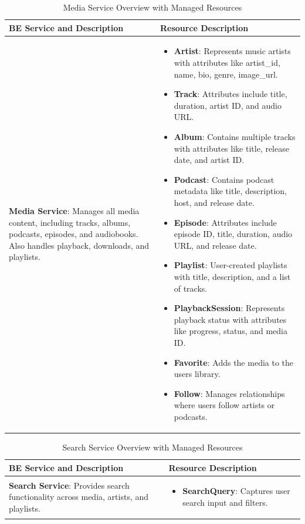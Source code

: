 \documentclass[a4paper,12pt]{article}
\begin{document}
\begin{table}[H]
    \centering
    \renewcommand{\arraystretch}{1.5}
    \begin{tabular}{|>{\centering\arraybackslash}m{4cm}|m{10cm}|}
    \hline
    \textbf{BE Service and Description} & \textbf{Resource Description} \\
    \hline
    \textbf{Media Service}: Manages all media content, including tracks, albums, podcasts, episodes, and audiobooks. Also handles playback, downloads, and playlists. & 
    \begin{itemize}[left=0pt]
        \item \textbf{Artist}: Represents music artists with attributes like artist\_id, name, bio, genre, image\_url.
        \item \textbf{Track}: Attributes include title, duration, artist ID, and audio URL.
        \item \textbf{Album}: Contains multiple tracks with attributes like title, release date, and artist ID.
        \item \textbf{Podcast}: Contains podcast metadata like title, description, host, and release date.
        \item \textbf{Episode}: Attributes include episode ID, title, duration, audio URL, and release date.
        \item \textbf{Playlist}: User-created playlists with title, description, and a list of tracks.
        \item \textbf{PlaybackSession}: Represents playback status with attributes like progress, status, and media ID.
        \item \textbf{Favorite}: Adds the media to the users library.
        \item \textbf{Follow}: Manages relationships where users follow artists or podcasts.
    \end{itemize} \\
    \hline
    \end{tabular}
    \caption{Media Service Overview with Managed Resources}
\end{table}

\begin{table}[H]
    \centering
    \renewcommand{\arraystretch}{1.5}
    \begin{tabular}{|>{\centering\arraybackslash}m{4cm}|m{10cm}|}
    \hline
    \textbf{BE Service and Description} & \textbf{Resource Description} \\
    \hline
    \textbf{Search Service}: Provides search functionality across media, artists, and playlists. & 
    \begin{itemize}[left=0pt]
        \item \textbf{SearchQuery}: Captures user search input and filters.
    \end{itemize} \\
    \hline
    \end{tabular}
    \caption{Search Service Overview with Managed Resources}
\end{table}
\end{document}
